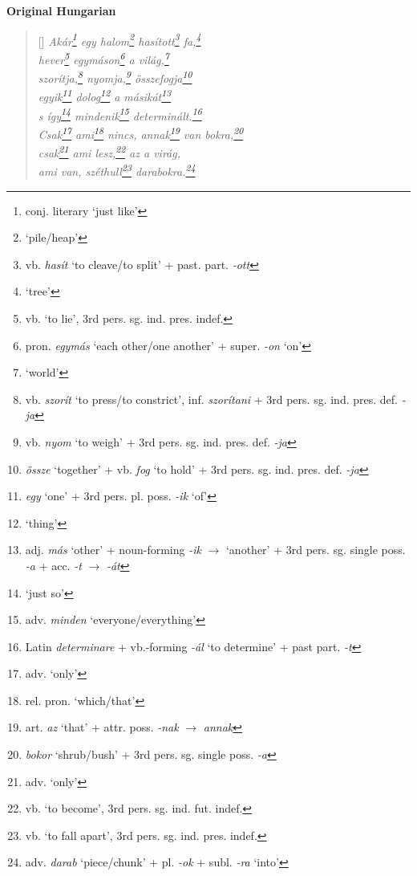 \documentclass[a4paper,12pt,twoside,final]{book}
\begin{document}
\newpage


\noindent \textbf{Original Hungarian}



\settowidth{\versewidth}{Csak ami nincs, annak van bokra,}

\begin{verse}[\versewidth]
  \it
  Akár\footnote{conj. literary `just like'} egy
  halom\footnote{`pile/heap'} hasított\footnote{vb.
  \emph{hasít} `to cleave/to split' +
  past. part. \emph{-ott} } fa,\footnote{`tree'} \\
  hever\footnote{vb. `to lie', 3rd pers. sg. ind. pres. indef.}
  egymáson\footnote{pron. \emph{egymás} `each other/one
  another' + super. \emph{-on} `on'} a világ,\footnote{`world'} \\
  szorítja,\footnote{vb. \emph{szorít} `to press/to
  constrict', inf. \emph{szorítani} + 3rd
  pers. sg. ind. pres. def. \emph{-ja}} nyomja,\footnote{vb.
  \emph{nyom} `to weigh' + 3rd pers. sg. ind. pres. def. \emph{-ja}}
  összefogja\footnote{\emph{össze} `together' + vb. \emph{fog}
  `to hold' + 3rd pers. sg. ind. pres. def. \emph{-ja}} \\
  egyik\footnote{\emph{egy} `one' + 3rd
  pers. pl. poss. \emph{-ik} `of' } dolog\footnote{`thing'} a
  másikát\footnote{adj. \emph{más} `other' + noun-forming \emph{-ik}
  $\rightarrow$ `another' + 3rd pers. sg. single poss. \emph{-a} +
  acc. \emph{-t} $\rightarrow$ \emph{-át}} \\
  s így\footnote{`just so'} mindenik\footnote{adv. \emph{minden}
  `everyone/everything'} determinált.\footnote{Latin \emph{determinare} +
  vb.-forming \emph{-ál} `to determine' + past part. \emph{-t}} \\
  Csak\footnote{adv. `only'} ami\footnote{rel. pron. `which/that'} nincs,
  annak\footnote{art. \emph{az} `that' + attr. poss. \emph{-nak}
  $\rightarrow$ \emph{annak}}
  van bokra,\footnote{\emph{bokor} `shrub/bush' + 3rd
  pers. sg. single poss. \emph{-a}} \\
  csak\footnote{adv. `only'} ami lesz,\footnote{vb. `to
  become', 3rd pers. sg. ind. fut. indef.} az a virág, \\
  ami van, széthull\footnote{vb. `to fall apart',
  3rd pers. sg. ind. pres. indef.}
  darabokra.\footnote{adv. \emph{darab} `piece/chunk' +
  pl. \emph{-ok} + subl. \emph{-ra} `into'} \\
\end{verse}
\end{document}
